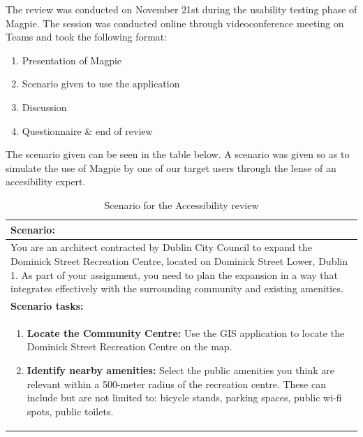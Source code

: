\noindent The review was conducted on November 21st during the usability testing phase of Magpie. The session was conducted online through videoconference meeting on Teams and took the following format:
\begin{enumerate}
    \item Presentation of Magpie
    \item Scenario given to use the application
    \item Discussion
    \item Questionnaire \& end of review
\end{enumerate}
The scenario given can be seen in the table below. A scenario was given so as to simulate the use of Magpie by one of our target users through the lense of an accesibility expert.
\begin{table}[h!]
    \centering
    \caption{Scenario for the Accessibility review}
    \begin{tabular}{|p{}|}
        \hline
        \textbf{Scenario:}                                                                                                                                                                                                                                                                                         \\
        \hline
        You are an architect contracted by Dublin City Council to expand the Dominick Street Recreation Centre, located on Dominick Street Lower, Dublin 1. As part of your assignment, you need to plan the expansion in a way that integrates effectively with the surrounding community and existing amenities. \\
        \hline
        \textbf{Scenario tasks:}                                                                                                                                                                                                                                                                                   \\
        \hline
        \begin{enumerate}
            \item \textbf{Locate the Community Centre:} Use the GIS application to locate the Dominick Street Recreation Centre on the map.
            \item \textbf{Identify nearby amenities:} Select the public amenities you think are relevant within a 500-meter radius of the recreation centre. These can include but are not limited to: bicycle stands, parking spaces, public wi-fi spots, public toilets.

\end{enumerate}
\end{tabular}
\end{table}
